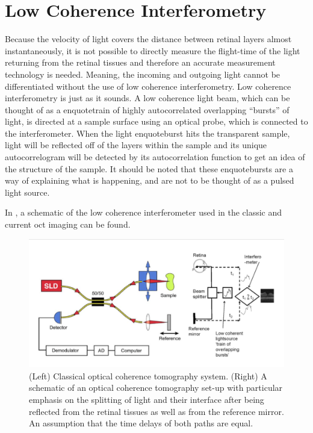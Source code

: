 \section{Low Coherence Interferometry}
Because the velocity of light covers the distance between retinal layers 
almost instantaneously, it is not possible to directly measure the flight-time 
of the light returning from the retinal tissues and therefore an accurate 
measurement technology is needed. \cite{mbib_5} Meaning, the incoming 
and outgoing light cannot be differentiated without the use of low
coherence interferometry. Low coherence interferometry is just as it
sounds.  A low coherence light beam, which can be thought of as
a enquote{train of highly autocorrelated overlapping \enquote{bursts} of light},
is directed at a sample surface using an optical probe, which is connected
to the interferometer.\cite{mbib_4}  When the light enquote{burst} hits the
transparent sample, light will be reflected off of the layers within
the sample and its unique autocorrelogram will be detected by its
autocorrelation function to get an idea of the structure of the sample.
\cite{mbib_4,mbib_3,mbib_6} It should be noted that these
enquote{bursts} are a way of explaining what is happening, and are not
to be thought of as a pulsed light source.

In , a schematic of the low coherence interferometer used
in the classic and current \Gls{oct} imaging can be found.

\begin{figure}[H]
\centering
\includegraphics[width=14cm]{figures/morgan_1}
\caption{(Left) Classical optical coherence tomography system. 
(Right) A schematic of an optical coherence tomography set-up with particular emphasis on the splitting of light and their interface after being reflected from the retinal tissues as well as from the reference mirror.  An assumption that the time delays of both paths are equal. \cite{mbib_6,mbib_4} }
\label{fig:m_1}
\end{figure}

